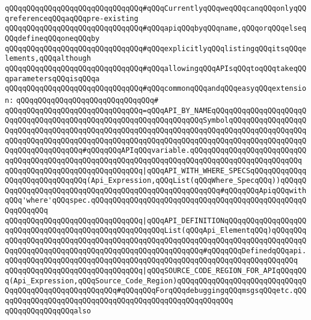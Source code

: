 \verb|qQQqqQQqqQQqqQQqqQQqqQQqqQQqqQQq#qQQqCurrentlyqQQqweqQQqcanqQQqonlyqQQqreferenceqQQqaqQQqpre-existing|\newline
\verb|qQQqqQQqqQQqqQQqqQQqqQQqqQQqqQQq#qQQqapiqQQqbyqQQqname,qQQqorqQQqelseqQQqdefineqQQqoneqQQqby|\newline
\verb|qQQqqQQqqQQqqQQqqQQqqQQqqQQqqQQq#qQQqexplicitlyqQQqlistingqQQqitsqQQqelements,qQQqalthough|\newline
\verb|qQQqqQQqqQQqqQQqqQQqqQQqqQQqqQQq#qQQqallowingqQQqAPIsqQQqtoqQQqtakeqQQqparametersqQQqisqQQqa|\newline
\verb|qQQqqQQqqQQqqQQqqQQqqQQqqQQqqQQq#qQQqcommonqQQqandqQQqeasyqQQqextension:|\newline
\verb|qQQqqQQqqQQqqQQqqQQqqQQqqQQqqQQq#|\newline
\verb|qQQqqQQqqQQqqQQqqQQqqQQqqQQqqQQq=qQQqAPI_BY_NAMEqQQqqQQqqQQqqQQqqQQqqQQqqQQqqQQqqQQqqQQqqQQqqQQqqQQqqQQqqQQqqQQqqQQqSymbolqQQqqQQqqQQqqQQqqQQqqQQqqQQqqQQqqQQqqQQqqQQqqQQqqQQqqQQqqQQqqQQqqQQqqQQqqQQqqQQqqQQqqQQqqQQqqQQqqQQqqQQqqQQqqQQqqQQqqQQqqQQqqQQqqQQqqQQqqQQqqQQqqQQqqQQqqQQqqQQqqQQqqQQqqQQqqQQq#qQQqqQQqAPIqQQqvariable.qQQqqQQqqQQqqQQqqQQqqQQqqQQqqQQqqQQqqQQqqQQqqQQqqQQqqQQqqQQqqQQqqQQqqQQqqQQqqQQqqQQqqQQqqQQqqQQq|\newline
\verb|qQQqqQQqqQQqqQQqqQQqqQQqqQQqqQQq|\verb#|qQQqAPI_WITH_WHERE_SPECSqQQqqQQqqQQqqQQqqQQqqQQqqQQqqQQq(Api_Expression,qQQqList(qQQqWhere_SpecqQQq))qQQqqQQqqQQqqQQqqQQqqQQqqQQqqQQqqQQqqQQqqQQqqQQqqQQqqQQq#\verb|#qQQqqQQqApiqQQqwithqQQq'where'qQQqspec.qQQqqQQqqQQqqQQqqQQqqQQqqQQqqQQqqQQqqQQqqQQqqQQqqQQqqQQqqQQq|\newline
\verb|qQQqqQQqqQQqqQQqqQQqqQQqqQQqqQQq|\verb#|qQQqAPI_DEFINITIONqQQqqQQqqQQqqQQqqQQqqQQqqQQqqQQqqQQqqQQqqQQqqQQqqQQqqQQqList(qQQqApi_ElementqQQq)qQQqqQQqqQQqqQQqqQQqqQQqqQQqqQQqqQQqqQQqqQQqqQQqqQQqqQQqqQQqqQQqqQQqqQQqqQQqqQQqqQQqqQQqqQQqqQQqqQQqqQQqqQQqqQQqqQQqqQQqqQQq#\verb|#qQQqqQQqDefinedqQQqapi.qQQqqQQqqQQqqQQqqQQqqQQqqQQqqQQqqQQqqQQqqQQqqQQqqQQqqQQqqQQqqQQqqQQq|\newline
\verb|qQQqqQQqqQQqqQQqqQQqqQQqqQQqqQQq|\verb#|qQQqSOURCE_CODE_REGION_FOR_APIqQQqqQQq(Api_Expression,qQQqSource_Code_Region)qQQqqQQqqQQqqQQqqQQqqQQqqQQqqQQqqQQqqQQqqQQqqQQqqQQqqQQq#\verb|#qQQqqQQqForqQQqdebuggingqQQqmsgsqQQqetc.qQQqqQQqqQQqqQQqqQQqqQQqqQQqqQQqqQQqqQQqqQQqqQQqqQQqqQQq|\newline
\newline
\newline
\newline
\verb|qQQqqQQqqQQqqQQqalso|\newline
